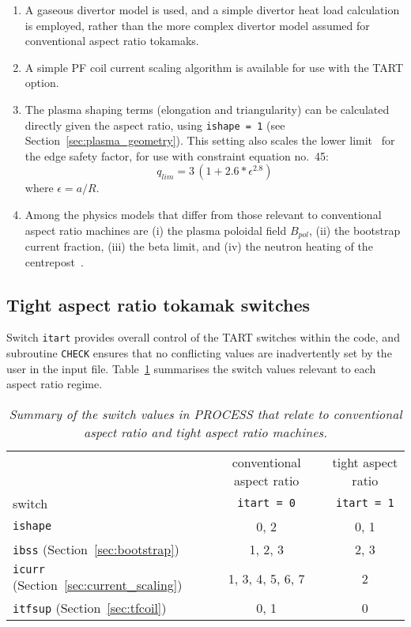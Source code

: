 \documentclass[11pt,a4paper]{report}
\newcommand{\process}{\mbox{\texttt{PROCESS}}}
\begin{document}
\begin{enumerate}
\item A gaseous divertor model is used, and a simple divertor heat load
  calculation is employed, rather than the more complex divertor model assumed
  for conventional aspect ratio tokamaks.

\item A simple PF coil current scaling algorithm is
  available for use with the TART option.

\item The plasma shaping terms (elongation and triangularity) can be
  calculated directly given the aspect ratio, using \texttt{ishape = 1} (see
  Section~\ref{sec:plasma_geometry}). This setting also scales the lower
  limit~\cite{storac} for the edge safety factor, for use with constraint
  equation no.\ 45:
  \begin{equation}
    q_{lim} = 3 \, (1 + 2.6*\epsilon^{2.8})
  \end{equation}
  where $\epsilon = a/R$. 

\item Among the physics models that differ from those relevant to conventional
  aspect ratio machines are (i) the plasma poloidal field $B_{pol}$, (ii) the
  bootstrap current fraction, (iii) the beta limit, and (iv) the neutron
  heating of the centrepost~\cite{storac}.

\end{enumerate}

\subsection{Tight aspect ratio tokamak switches}

Switch \texttt{itart} provides overall control of the TART switches within the
code, and subroutine \texttt{CHECK} ensures that no conflicting values are
inadvertently set by the user in the input file. Table~\ref{tab:tart}
summarises the switch values relevant to each aspect ratio regime.
\begin{table}[tbph]
\begin{center}
  \begin{tabular}{||l|c|c||} \hline
    & conventional aspect ratio & tight aspect ratio \\
    switch & \texttt{itart = 0} & \texttt{itart = 1} \\ \hline
    \texttt{ishape} & 0, 2 & 0, 1 \\
    \texttt{ibss} (Section~\ref{sec:bootstrap}) & 1, 2, 3 & 2, 3 \\
    \texttt{icurr} (Section~\ref{sec:current_scaling}) & 1, 3, 4, 5, 6, 7 & 2 \\
    \texttt{itfsup} (Section~\ref{sec:tfcoil}) & 0, 1 & 0 \\
    \hline
\end{tabular}
\end{center}
\caption[\process\ switches for tight aspect ratio machines]
{\label{tab:tart}
  \textit{Summary of the switch values in PROCESS that relate to
    conventional aspect ratio and tight aspect ratio machines.}
}
\end{table}
\end{document}
